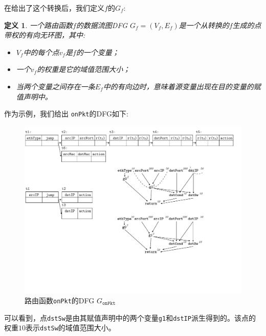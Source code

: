 \documentclass{ctexart}
\newtheorem{definition}{定义}
\begin{document}
在给出了这个转换后，我们定义$f$的$G_f$:

\begin{definition} 一个路由函数$f$的数据流图DFG $G_f = (V_f, E_f)$是一个从转换的$f$生成的点带权的有向无环图，其中:
\begin{itemize}
  \item $V_f$中的每个点$v_f$是$f$的一个变量；
  \item 一个$v_f$的权重是它的域值范围大小；
  \item 当两个变量之间存在一条$E_f$中的有向边时，意味着源变量出现在目的变量的赋值声明中。
\end{itemize}
\end{definition}

作为示例，我们给出 \texttt{onPkt}的DFG如下:
\begin{figure}[tbh]
    \centering
    \vspace{-1mm}
    \includegraphics[scale = 0.6]{figures/figure2.pdf}
    \vspace{-2mm}
    \caption{路由函数\texttt{onPkt}的DFG $G_{\texttt{onPkt}}$}
    \label{cap:fig:onpkt-dfg}
    \vspace{-2mm}
\end{figure}

可以看到，点\texttt{dstSw}是由其赋值声明中的两个变量\texttt{g1}和\texttt{dstIP}派生得到的。该点的权重$10$表示\texttt{dstSw}的域值范围大小。


\end{document}

